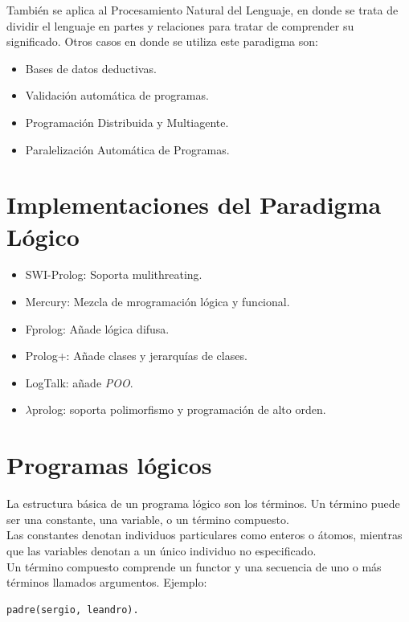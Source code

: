 \documentclass[12pt,titlepage]{report}
\begin{document}
También se aplica al Procesamiento Natural del Lenguaje, en donde se trata de dividir el lenguaje en partes y relaciones para tratar de comprender su significado.
Otros casos en donde se utiliza este paradigma son: \\
\begin{itemize}
    \item Bases de datos deductivas.
    \item Validación automática de programas.
    \item Programación Distribuida y Multiagente.
    \item Paralelización Automática de Programas.
\end{itemize}

\section{Implementaciones del Paradigma Lógico}

\begin{itemize}
    \item SWI-Prolog: Soporta mulithreating.
    \item Mercury: Mezcla de mrogramación lógica y funcional.
    \item Fprolog: Añade lógica difusa.
    \item Prolog+: Añade clases y jerarquías de clases.
    \item LogTalk: añade \textit{POO}.
    \item $\lambda$prolog: soporta polimorfismo y programación de alto orden.
\end{itemize}

\section{Programas lógicos}

La estructura básica de un programa lógico son los términos. Un término puede ser una constante, una variable, o un término compuesto. \\

Las constantes denotan individuos particulares como enteros o átomos, mientras que las variables denotan a un único individuo no especificado. \\

Un término compuesto comprende un functor y una secuencia de uno o más términos llamados argumentos. Ejemplo:
\begin{lstlisting}
padre(sergio, leandro).
\end{lstlisting}
\end{document}
